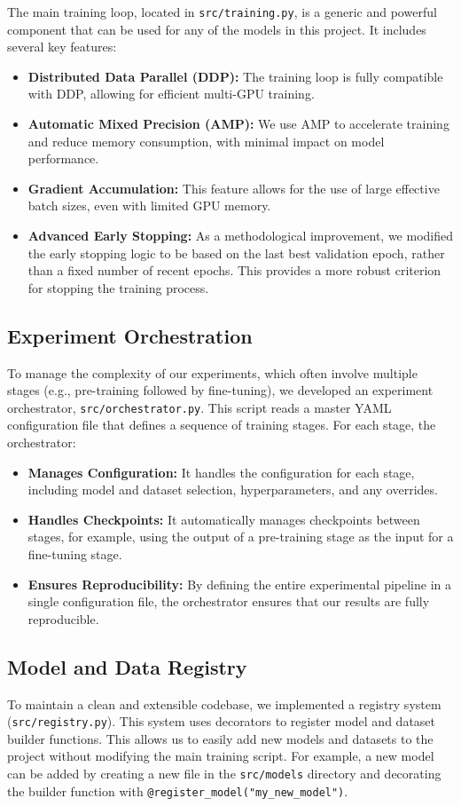 The main training loop, located in \texttt{src/training.py}, is a generic and powerful component that can be used for any of the models in this project. It includes several key features:

\begin{itemize}
    \item \textbf{Distributed Data Parallel (DDP):} The training loop is fully compatible with DDP, allowing for efficient multi-GPU training.
    \item \textbf{Automatic Mixed Precision (AMP):} We use AMP to accelerate training and reduce memory consumption, with minimal impact on model performance.
    \item \textbf{Gradient Accumulation:} This feature allows for the use of large effective batch sizes, even with limited GPU memory.
    \item \textbf{Advanced Early Stopping:} As a methodological improvement, we modified the early stopping logic to be based on the last best validation epoch, rather than a fixed number of recent epochs. This provides a more robust criterion for stopping the training process.
\end{itemize}

\subsection{Experiment Orchestration}

To manage the complexity of our experiments, which often involve multiple stages (e.g., pre-training followed by fine-tuning), we developed an experiment orchestrator, \texttt{src/orchestrator.py}. This script reads a master YAML configuration file that defines a sequence of training stages. For each stage, the orchestrator:

\begin{itemize}
    \item \textbf{Manages Configuration:} It handles the configuration for each stage, including model and dataset selection, hyperparameters, and any overrides.
    \item \textbf{Handles Checkpoints:} It automatically manages checkpoints between stages, for example, using the output of a pre-training stage as the input for a fine-tuning stage.
    \item \textbf{Ensures Reproducibility:} By defining the entire experimental pipeline in a single configuration file, the orchestrator ensures that our results are fully reproducible.
\end{itemize}

\subsection{Model and Data Registry}

To maintain a clean and extensible codebase, we implemented a registry system (\texttt{src/registry.py}). This system uses decorators to register model and dataset builder functions. This allows us to easily add new models and datasets to the project without modifying the main training script. For example, a new model can be added by creating a new file in the \texttt{src/models} directory and decorating the builder function with \texttt{@register\_model("my\_new\_model")}.
